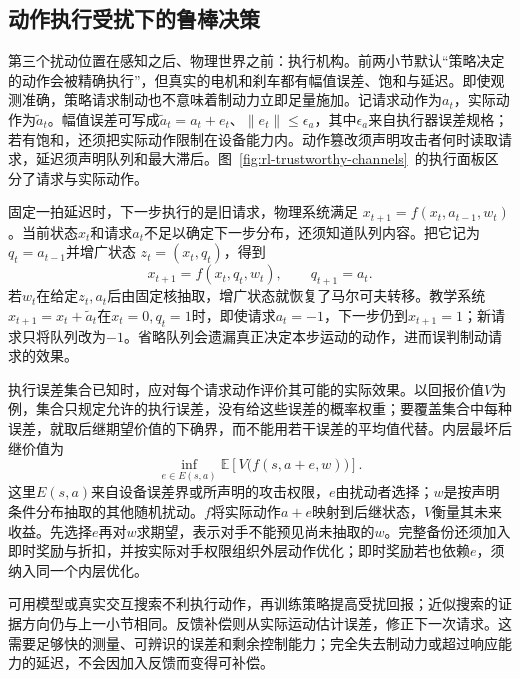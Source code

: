 \subsection{动作执行受扰下的鲁棒决策}
\label{sec:rl-trustworthy-actuation}

第三个扰动位置在感知之后、物理世界之前：执行机构。前两小节默认“策略决定的动作会被精确执行”，但真实的电机和刹车都有幅值误差、饱和与延迟。即使观测准确，策略请求制动也不意味着制动力立即足量施加。记请求动作为$a_t$，实际动作为$\widetilde a_t$。幅值误差可写成$\widetilde a_t=a_t+e_t$、$\|e_t\|\leq\epsilon_a$，其中$\epsilon_a$来自执行器误差规格；若有饱和，还须把实际动作限制在设备能力内。动作篡改须声明攻击者何时读取请求，延迟须声明队列和最大滞后。图~\ref{fig:rl-trustworthy-channels}~的执行面板区分了请求与实际动作。

固定一拍延迟时，下一步执行的是旧请求，物理系统满足
$x_{t+1}=f(x_t,a_{t-1},w_t)$。当前状态$x_t$和请求$a_t$不足以确定下一步分布，还须知道队列内容。把它记为$q_t=a_{t-1}$并增广状态
$z_t=(x_t,q_t)$，得到
\begin{equation}
  x_{t+1}=f(x_t,q_t,w_t),\qquad q_{t+1}=a_t.
  \label{eq:rl-trustworthy-delay}
\end{equation}
若$w_t$在给定$z_t,a_t$后由固定核抽取，增广状态就恢复了马尔可夫转移。教学系统$x_{t+1}=x_t+\widetilde a_t$在$x_t=0,q_t=1$时，即使请求$a_t=-1$，下一步仍到$x_{t+1}=1$；新请求只将队列改为$-1$。省略队列会遗漏真正决定本步运动的动作，进而误判制动请求的效果。

执行误差集合已知时，应对每个请求动作评价其可能的实际效果。以回报价值$V$为例，集合只规定允许的执行误差，没有给这些误差的概率权重；要覆盖集合中每种误差，就取后继期望价值的下确界，而不能用若干误差的平均值代替。内层最坏后继价值为
\begin{equation}
  \inf_{e\in E(s,a)}
       \mathbb E\!\left[V\bigl(f(s,a+e,w)\bigr)\right].
  \label{eq:rl-trustworthy-actuation-backup}
\end{equation}
这里$E(s,a)$来自设备误差界或所声明的攻击权限，$e$由扰动者选择；$w$是按声明条件分布抽取的其他随机扰动。$f$将实际动作$a+e$映射到后继状态，$V$衡量其未来收益。先选择$e$再对$w$求期望，表示对手不能预见尚未抽取的$w$。完整备份还须加入即时奖励与折扣，并按实际对手权限组织外层动作优化；即时奖励若也依赖$e$，须纳入同一个内层优化。

可用模型或真实交互搜索不利执行动作，再训练策略提高受扰回报；近似搜索的证据方向仍与上一小节相同。反馈补偿则从实际运动估计误差，修正下一次请求。这需要足够快的测量、可辨识的误差和剩余控制能力；完全失去制动力或超过响应能力的延迟，不会因加入反馈而变得可补偿。

